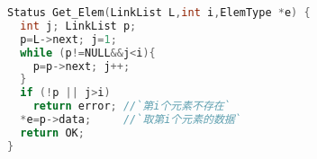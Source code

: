 \begin{lstlisting}[language=C,frame=tb,backgroundcolor=\color{red!10}]
Status Get_Elem(LinkList L,int i,ElemType *e) {
  int j; LinkList p;
  p=L->next; j=1;
  while (p!=NULL&&j<i){
    p=p->next; j++;
  }
  if (!p || j>i) 
    return error; //`第i个元素不存在`
  *e=p->data;     //`取第i个元素的数据`
  return OK;
}
\end{lstlisting}
